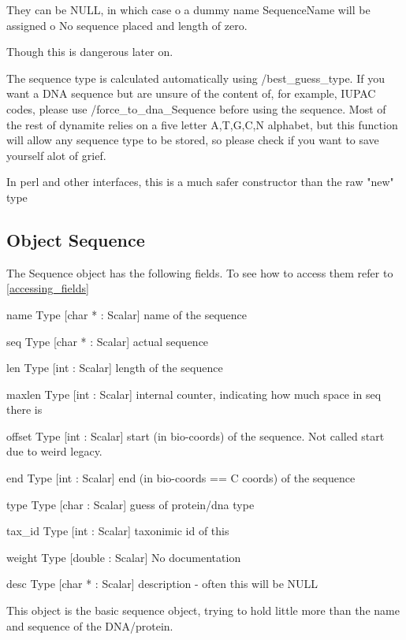 They can be NULL, in which case 
o  a dummy name SequenceName will be assigned
o  No sequence placed and length of zero.


Though this is dangerous later on. 


The sequence type is calculated automatically using
/best_guess_type. If you want a DNA sequence but are
unsure of the content of, for example, IUPAC codes,
please use /force_to_dna_Sequence before using the
sequence. Most of the rest of dynamite relies on a
five letter A,T,G,C,N alphabet, but this function
will allow any sequence type to be stored, so please
check if you want to save yourself alot of grief.


In perl and other interfaces, this is a much safer
constructor than the raw "new" type




\subsection{Object Sequence}

\label{object_Sequence}

The Sequence object has the following fields. To see how to access them refer to \ref{accessing_fields}
\begin{description}
\item{name} Type [char * : Scalar]  name of the sequence

\item{seq} Type [char * : Scalar]  actual sequence

\item{len} Type [int : Scalar]  length of the sequence

\item{maxlen} Type [int : Scalar]  internal counter, indicating how much space in seq there is

\item{offset} Type [int : Scalar]  start (in bio-coords) of the sequence. Not called start due to weird legacy.

\item{end} Type [int : Scalar]  end (in bio-coords == C coords) of the sequence

\item{type} Type [char : Scalar]  guess of protein/dna type

\item{tax_id} Type [int : Scalar]  taxonimic id of this

\item{weight} Type [double : Scalar] No documentation

\item{desc} Type [char * : Scalar]  description - often this will be NULL

\end{description}
This object is the basic sequence object,
trying to hold little more than the 
name and sequence of the DNA/protein. 


